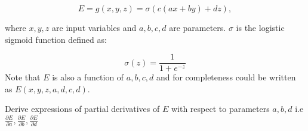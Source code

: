 \documentclass[11pt]{article}
\begin{document}
\begin{equation*}
  E = g(x, y, z) = \sigma(c(ax + by) + dz),
\end{equation*}

where $x, y, z$ are input variables and $a, b, c, d$ are parameters. $\sigma$ is the logistic sigmoid function defined as:

\begin{equation}
  \sigma(z) = \frac{1}{1 + e^{-z}}
\end{equation}
Note that $E$ is also a function of $a,b,c,d$ and for completeness
could be written as $E(x,y,z,a,d,c,d)$.

Derive expressions of partial derivatives of $E$ with respect to parameters $a, b, d$ i.e $\frac{\partial{E}}{\partial{a}}, \frac{\partial{E}}{\partial{b}}, \frac{\partial{E}}{\partial{d}}$
\end{document}
